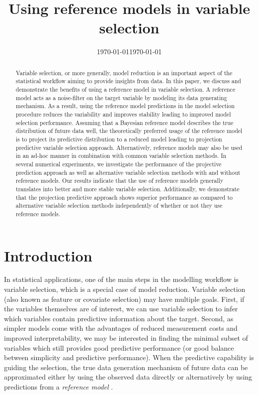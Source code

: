 \documentclass[a4]{article}
\title{Using reference models in variable selection 
	\vspace{.1in}}
\date{\today}
\date{\today}
\theoremstyle{definition}
\begin{document}
\maketitle
\begin{abstract}
  Variable selection, or more generally, model reduction is an important aspect of the statistical workflow aiming to provide insights from data. In this paper, we discuss and demonstrate the benefits of using a reference model in variable selection. A reference model acts as a noise-filter on the target variable by modeling its data generating mechanism. As a result, using the reference model predictions in the model selection procedure reduces the variability and improves stability leading to improved model selection performance. Assuming that a Bayesian reference model describes the true distribution of future data well, the theoretically preferred usage of the reference model is to project its predictive distribution to a reduced model leading to projection predictive variable selection approach. Alternatively, reference models may also be used in an ad-hoc manner in combination with common variable selection methods.  In several numerical experiments, we investigate the performance of the projective prediction approach as well as alternative variable selection methods with and without reference models. Our results indicate that the use of reference models generally translates into better and more stable variable selection. Additionally, we demonstrate that the projection predictive approach shows superior performance as compared to alternative variable selection methods independently of whether or not they use reference models.
\end{abstract}

\hypertarget{introduction}{%
\section{Introduction}\label{introduction}}

In statistical applications, one of the main steps in the modelling
workflow is variable selection, which is a special case of
model reduction. Variable selection (also known as feature or 
covariate selection) may have multiple goals.  First,
if the variables themselves are of interest, we can use variable
selection to infer which variables contain predictive information
about the target. Second, as simpler models come with the
advantages of reduced measurement costs and improved interpretability,
we may be interested in finding the minimal subset of variables which
still provides good predictive performance (or good balance between
simplicity and predictive performance).  When the predictive
capability is guiding the selection, the true data generation
mechanism of future data can be approximated either by using the
observed data directly or alternatively by using predictions from a
\emph{reference model} \citep{vehtari2012survey}.
\end{document}
